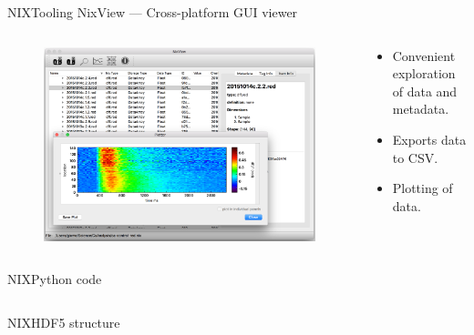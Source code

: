 \documentclass[10pt]{beamer}
\begin{document}
\begin{frame}{NIX}{Tooling}
    NixView --- Cross-platform GUI viewer

    \begin{columns}
        \begin{column}{0.5\textwidth}
            \begin{figure}
                \includegraphics[width=\textwidth]{nixview.pdf}
            \end{figure}
        \end{column}
        \begin{column}{0.5\textwidth}
            \begin{itemize}
                \item Convenient exploration of data and metadata.
                \item Exports data to CSV.\
                \item Plotting of data.
            \end{itemize}
        \end{column}
    \end{columns}
\end{frame}

\begin{frame}[fragile]{NIX}{Python code}
    \inputminted[fontsize=\footnotesize]{python}{./code/nixify-data.py}
\end{frame}

\begin{frame}[fragile]{NIX}{HDF5 structure}
    \inputminted[fontsize=\footnotesize]{shell}{./code/h5ls.out}
\end{frame}
\end{document}
